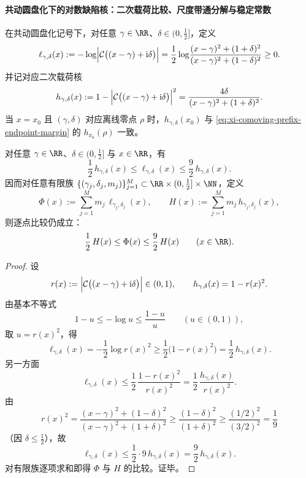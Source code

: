 \paragraph{共动圆盘化下的对数缺陷核：二次载荷比较、尺度带通分解与稳定常数}
在共动圆盘化记号下，对任意 \(\gamma\in\RR\)、\(\delta\in(0,\tfrac12]\)，定义
\[
\ell_{\gamma,\delta}(x)
:=
-\log\Bigl|\mathcal{C}\bigl((x-\gamma)+\mathrm{i}\delta\bigr)\Bigr|
=
\frac12\log\!\frac{(x-\gamma)^2+(1+\delta)^2}{(x-\gamma)^2+(1-\delta)^2}
\ge 0.
\]
并记对应二次载荷核
\[
h_{\gamma,\delta}(x)
:=
1-\Bigl|\mathcal{C}\bigl((x-\gamma)+\mathrm{i}\delta\bigr)\Bigr|^2
=
\frac{4\delta}{(x-\gamma)^2+(1+\delta)^2}.
\]
当 \(x=x_0\) 且 \((\gamma,\delta)\) 对应离线零点 \(\rho\) 时，\(h_{\gamma,\delta}(x_0)\) 与
\eqref{eq:xi-comoving-prefix-endpoint-margin} 的 \(h_{x_0}(\rho)\) 一致。

\begin{theorem}[临界带内对数载荷与二次载荷的全局双边比较]\label{thm:xi-logdefect-vs-quadratic-load-two-sided}
对任意 \(\gamma\in\RR\)、\(\delta\in(0,\tfrac12]\) 与 \(x\in\RR\)，有
\[
\frac12\,h_{\gamma,\delta}(x)
\le
\ell_{\gamma,\delta}(x)
\le
\frac92\,h_{\gamma,\delta}(x).
\]
因而对任意有限族 \(\{(\gamma_j,\delta_j,m_j)\}_{j=1}^{M}\subset \RR\times(0,\tfrac12]\times\NN\)，定义
\[
\Phi(x):=\sum_{j=1}^{M}m_j\,\ell_{\gamma_j,\delta_j}(x),
\qquad
H(x):=\sum_{j=1}^{M}m_j\,h_{\gamma_j,\delta_j}(x),
\]
则逐点比较仍成立：
\[
\frac12\,H(x)\le \Phi(x)\le \frac92\,H(x)\qquad(x\in\RR).
\]
\end{theorem}
\begin{proof}
设
\[
r(x):=\Bigl|\mathcal{C}\bigl((x-\gamma)+\mathrm{i}\delta\bigr)\Bigr|\in(0,1),
\qquad
h_{\gamma,\delta}(x)=1-r(x)^2.
\]
由基本不等式
\[
1-u\le -\log u\le \frac{1-u}{u}\qquad(u\in(0,1)),
\]
取 \(u=r(x)^2\)，得
\[
\ell_{\gamma,\delta}(x)
=-\frac12\log r(x)^2
\ge \frac12\bigl(1-r(x)^2\bigr)
=\frac12\,h_{\gamma,\delta}(x).
\]
另一方面
\[
\ell_{\gamma,\delta}(x)
\le \frac12\,\frac{1-r(x)^2}{r(x)^2}
=\frac12\,\frac{h_{\gamma,\delta}(x)}{r(x)^2}.
\]
由
\[
r(x)^2=\frac{(x-\gamma)^2+(1-\delta)^2}{(x-\gamma)^2+(1+\delta)^2}
\ge \frac{(1-\delta)^2}{(1+\delta)^2}
\ge \frac{(1/2)^2}{(3/2)^2}
=\frac19
\]
（因 \(\delta\le\tfrac12\)），故
\[
\ell_{\gamma,\delta}(x)\le \frac12\cdot 9\,h_{\gamma,\delta}(x)=\frac92\,h_{\gamma,\delta}(x).
\]
对有限族逐项求和即得 \(\Phi\) 与 \(H\) 的比较。证毕。
\end{proof}

